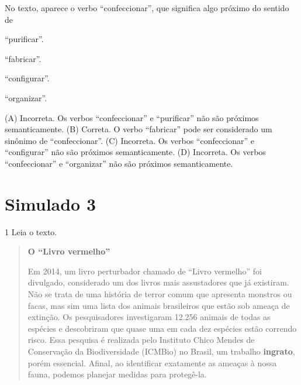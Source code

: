 No texto, aparece o verbo ``confeccionar'', que significa algo próximo do sentido de

\begin{escolha}
\item ``purificar''.

\item ``fabricar''.

\item ``configurar''.

\item ``organizar''.
\end{escolha}


(A) Incorreta. Os verbos ``confeccionar'' e ``purificar'' não são próximos semanticamente.
(B) Correta. O verbo ``fabricar'' pode ser considerado um sinônimo de ``confeccionar''.
(C) Incorreta. Os verbos ``confeccionar'' e ``configurar'' não são próximos semanticamente.
(D) Incorreta. Os verbos ``confeccionar'' e ``organizar'' não são próximos semanticamente.

\chapter{Simulado 3}

\num{1} Leia o texto.

\begin{quote}
\textbf{O ``Livro vermelho''}

Em 2014, um livro perturbador chamado de ``Livro vermelho'' foi divulgado, considerado um dos livros mais assustadores que já existiram. Não se trata de uma história de terror comum que apresenta monstros ou facas, mas sim uma lista dos animais brasileiros que estão sob ameaça de extinção. Os pesquisadores investigaram 12.256 animais de todas as espécies e descobriram que quase uma em cada dez espécies estão correndo risco. Essa pesquisa é realizada pelo Instituto Chico Mendes de Conservação da Biodiversidade (ICMBio) no Brasil, um trabalho \textbf{ingrato}, porém essencial. Afinal, ao identificar exatamente as ameaças à nossa fauna, podemos planejar medidas para protegê-la.

\end{quote}

